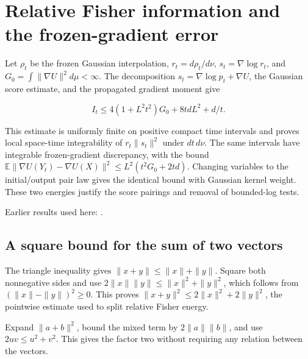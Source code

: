 \documentclass[11pt,a4paper]{report}
\begin{document}
\section{\texorpdfstring{Relative Fisher information and the frozen-gradient error}{Relative Fisher information and the frozen-gradient error}}
\label{proof-module-UnadjustedLangevin-LSI-GaussianEnergyIntegrability-lean}


Let \(\rho_t\) be the frozen Gaussian interpolation, \(r_t=d\rho_t/d\nu\), \(s_t=\nabla\log r_t\), and \(G_0=\int\|\nabla U\|^2d\mu<\infty\). The decomposition \(s_t=\nabla\log p_t+\nabla U\), the Gaussian score estimate, and the propagated gradient moment give

\[I_t\le4(1+L^2t^2)G_0+8tdL^2+d/t.\]

This estimate is uniformly finite on positive compact time intervals and proves local space-time integrability of \(r_t\|s_t\|^2\) under \(dt\,d\nu\). The same intervals have integrable frozen-gradient discrepancy, with the bound \(\mathbb E\|\nabla U(Y_t)-\nabla U(X)\|^2\le L^2(t^2G_0+2td)\). Changing variables to the initial/\allowbreak{}output pair law gives the identical bound with Gaussian kernel weight. These two energies justify the score pairings and removal of bounded-log tests.



Earlier results used here: \cite[Section~3.38]{LangevinLean2026ULASC}.
\subsection{\texorpdfstring{A square bound for the sum of two vectors}{A square bound for the sum of two vectors}}
\label{report-step-UnadjustedLangevin-LSI-GaussianEnergyIntegrability-lean-1}


The triangle inequality gives \(\|x+y\|\le\|x\|+\|y\|\). Square both nonnegative sides and use \(2\|x\|\|y\|\le\|x\|^2+\|y\|^2\), which follows from \((\|x\|-\|y\|)^2\ge0\). This proves \(\|x+y\|^2\le2\|x\|^2+2\|y\|^2\), the pointwise estimate used to split relative Fisher energy.



Expand \(\|a+b\|^2\), bound the mixed term by \(2\|a\|\|b\|\), and use \(2uv\le u^2+v^2\). This gives the factor two without requiring any relation between the vectors.
\end{document}
